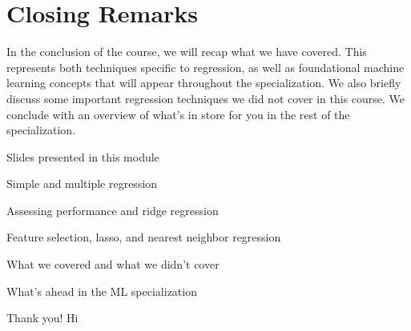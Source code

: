 \section{Closing Remarks}
In the conclusion of the course, we will recap what we have covered. This represents both techniques specific to regression, as well as foundational machine learning concepts that will appear throughout the specialization. We also briefly discuss some important regression techniques we did not cover in this course.
We conclude with an overview of what's in store for you in the rest of the specialization.

\item Slides presented in this module
\item Simple and multiple regression
\item Assessing performance and ridge regression
\item Feature selection, lasso, and nearest neighbor regression
\item What we covered and what we didn't cover
\item What's ahead in the ML specialization
\item Thank you!
Hi
